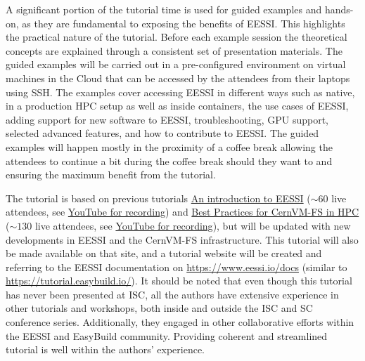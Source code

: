 A significant portion of the tutorial time is used for guided examples and hands-on,
as they are fundamental to exposing the benefits of EESSI.
This highlights the practical nature of the tutorial.
Before each example session the theoretical concepts are explained through a consistent set of presentation materials.
The guided examples will be carried out in a pre-configured environment on virtual machines in the Cloud that can be
accessed by the
attendees from their laptops using SSH. 
The examples cover accessing EESSI in different ways such as native, in a production HPC setup as well as inside
containers, the use cases of EESSI, adding support for new software to EESSI, troubleshooting, GPU support, selected
advanced features, and how to contribute to EESSI.
The guided examples will happen mostly in the proximity of a coffee break allowing the attendees to continue
a bit during the coffee break should they want to and ensuring the maximum benefit from the tutorial.

The tutorial is based on previous tutorials
\href{https://raw.githubusercontent.com/eessi/docs/main/talks/20231205-Introduction-to-EESSI-CASTIEL2/20231205-Introduction-to-EESSI-CASTIEL2.pdf}{An introduction to EESSI} ($\sim60$ live attendees, see \href{https://www.youtube.com/watch?v=KAYI9oKFLxA}{YouTube for recording}) and
\href{https://raw.githubusercontent.com/multixscale/cvmfs-tutorial-hpc-best-practices/main/files/Best-Practices-for-CernVM-FS-in-HPC-20231204.pdf}{Best Practices for CernVM-FS in HPC} ($\sim130$ live attendees, see \href{https://www.youtube.com/watch?v=L0Mmy7NBXDU}{YouTube for recording}),
but will be updated with new developments in EESSI and the CernVM-FS infrastructure.
This tutorial will also be made available on that site, and a tutorial website will be created and referring to the EESSI documentation on
\url{https://www.eessi.io/docs} (similar to \url{https://tutorial.easybuild.io/}).
It should be noted that even though this tutorial has never been presented at ISC, all the authors have extensive
experience in other tutorials and workshops, both inside and outside the ISC and SC conference series. Additionally,
they engaged in other collaborative efforts within the EESSI and EasyBuild community. Providing coherent and streamlined
tutorial is well within the authors' experience.



